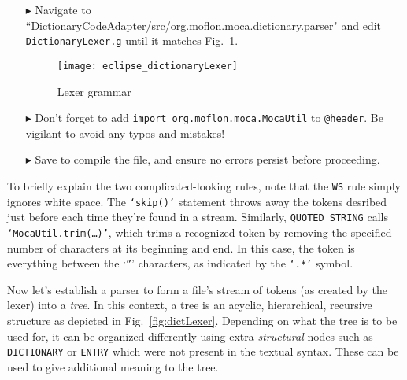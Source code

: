 \begin{itemize}
  
\item[$\blacktriangleright$] Navigate to ``Diction\-ary\-Code\-Adap\-ter/src/org.moflon.moca.dict\-ion\-ary\-.pars\-er" and edit \texttt{DictionaryLexer.g}
until it matches Fig.~\ref{eclipse:dictionaryLexer}. 


\newpage

\begin{figure}[!htbp]
\begin{center}
  \texttt{[image: eclipse\_dictionaryLexer]}
  \caption{Lexer grammar}
  \label{eclipse:dictionaryLexer}
\end{center}
\end{figure}

\item[$\blacktriangleright$] Don't forget to add \texttt{import org.moflon.moca.MocaUtil} to \texttt{@header}. Be vigilant to avoid any typos and mistakes!

\vspace{0.5cm}

\item[$\blacktriangleright$] Save to compile the file, and ensure no errors persist before proceeding.

\end{itemize}

\vspace{0.25cm}

To briefly explain the two complicated-looking rules, note that the \texttt{WS} rule simply ignores white space. The \texttt{`skip()'} statement throws away the
tokens desribed just before each time they're found in a stream. Similarly, \texttt{QUOTED\_STRING} calls \texttt{`MocaUtil.trim(\ldots)'}, which trims a
recognized token by removing the specified number of characters at its beginning and end. In this case, the token is everything between the `\texttt{''}'
characters, as indicated by the \texttt{`.*'} symbol.

\newpage

Now let's establish a parser to form a file's stream of tokens (as created by the lexer) into a \emph{tree}. In this context, a tree is an acyclic,
hierarchical, recursive structure as depicted in Fig.~\ref{fig:dictLexer}. Depending on what the tree is to be used for, it can be organized differently
using extra \emph{structural} nodes such as \texttt{DICTIONARY} or \texttt{ENTRY} which were not present in the textual syntax. These can be used to give
additional meaning to the tree.


